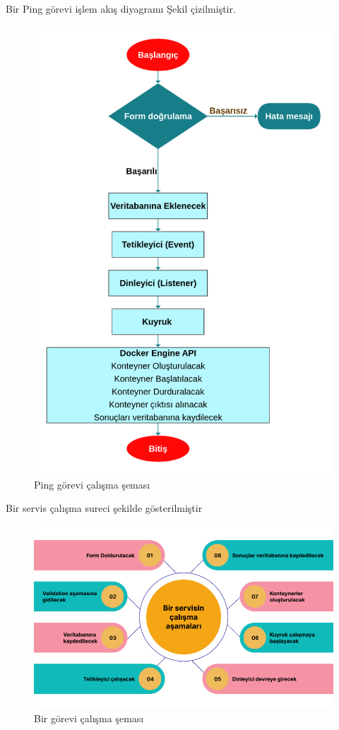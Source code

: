 Bir Ping görevi işlem akış diyagramı Şekil çizilmiştir.
\begin{figure}[H]
	\centering
	\includegraphics[width=0.9\linewidth]{images/flowchart4.png}
	\caption{Ping görevi çalışma şeması}
	\label{fig:ping_task_diagram}
\end{figure}

\newpage
Bir servis çalışma sureci şekilde gösterilmiştir
\begin{figure}[H]
	\centering
	\includegraphics[width=1\linewidth]{images/service.png}
	\caption{Bir görevi çalışma şeması}
	\label{fig:task_diagram}
\end{figure}

